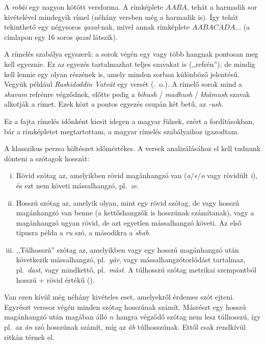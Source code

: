 A \emph{robâi} egy nagyon kötött versforma. A rímképlete $AABA$, tehát
a harmadik sor kivételével mindegyik rímel (néhány versben még a
harmadik is). Így tehát tekinthető egy négysoros \emph{qazal}-nak,
mivel annak rímképlete $AABACADA\dots$ (a címlapon egy 16 soros
\emph{qazal} látszik).

A rímelés szabálya egyszerű: a sorok végén egy vagy több hangnak
pontosan meg kell egyeznie. Ez az egyezés tartalmazhat teljes szavakat
is (,,refrén''), de mindig kell lennie egy olyan részének is, amely
minden sorban különböző jelentésű. Vegyük például \emph{Rashidoddin
Vatvât} egy versét (\pageref{Vatvat}.~o.). A rímelő sorok mind
a \emph{shavam} refrénre végződnek, előtte pedig a \emph{bihush}
/ \emph{madhush} / \emph{khâmush} szavak alkotják a rímet. Ezek közt a
pontos egyezés csupán két betű, az \emph{-ush}.

Ez a fajta rímelés időnként kicsit idegen a magyar fülnek, ezért a
fordításokban, bár a rímképletet megtartottam, a magyar rímelés
szabályaihoz igazodtam.

A klasszikus perzsa költészet időmértékes. A versek analizálásához
el kell tudnunk dönteni a szótagok hosszát:

\begin{enumerate}[i)]
  \item Rövid szótag az, amelyikben rövid magánhangzó van
    (\emph{a}/\emph{e}/\emph{o} vagy rövidült \emph{i}), és ezt nem
    követi mássalhangzó, pl.~\emph{ze}.
  \item Hosszú szótag az, amelyik olyan, mint egy rövid szótag, de
    vagy hosszú magánhangzó van benne (a kettőshangzók is hosszúnak
    számítanak), vagy a magánhangzó ugyan rövid, de azt egyetlen mássalhangzó
    követi. Az első típusra példa a \emph{ru} szó, a másodikra a
    \emph{shab}.
  \item ,,Túlhosszú'' szótag az, amelyikben vagy egy hosszú magánhangzó
    után következik mássalhangzó, pl.~\emph{yâr}, vagy
    mássalhangzótorlódást tartalmaz, pl.~\emph{dast}, vagy mindkettő,
    pl.~\emph{mâst}. A túlhosszú szótag metrikai szempontból hosszú +
    rövid értékű (\metra{\m\b}).
\end{enumerate}

Van ezen kívül még néhány kivételes eset, amelyekről érdemes szót ejteni.
Egyrészt verssor végén minden szótag hosszúnak számít.
Másrészt egy hosszú magánhangzó után magában álló $n$ hangra végződő
szótag nem lesz túlhosszú, így pl.~az \emph{ân} szó hosszúnak számít, míg
az \emph{âb} túlhosszúnak. Ettől csak rendkívül ritkán térnek el.

